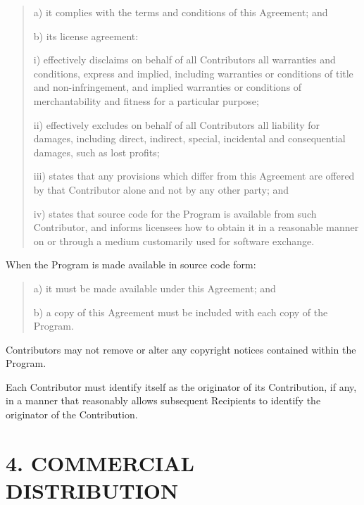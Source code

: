 \begin{quote}
a) it complies with the terms and conditions of this Agreement; and 

b) its license agreement: 

i) effectively disclaims on behalf of all Contributors all warranties and
conditions, express and implied, including warranties or conditions of title and
non-infringement, and implied warranties or conditions of merchantability and
fitness for a particular purpose; 

ii) effectively excludes on behalf of all Contributors all liability for
damages, including direct, indirect, special, incidental and consequential
damages, such as lost profits; 

iii) states that any provisions which differ from this Agreement are 
offered by that Contributor alone and not by any other party; and 

iv) states that source code for the Program is available from such Contributor,
and informs licensees how to obtain it in a reasonable manner on or through a 
medium customarily used for software exchange. 
\end{quote}

When the Program is made available in source code form:

\begin{quote}
a) it must be made available under this Agreement; and 

b) a copy of this Agreement must be included with each copy of the Program.
\end{quote}

Contributors may not remove or alter any copyright notices contained within the 
Program.

Each Contributor must identify itself as the originator of its Contribution, if 
any, in a manner that reasonably allows subsequent Recipients to identify the 
originator of the Contribution.


\section*{4. COMMERCIAL DISTRIBUTION}

